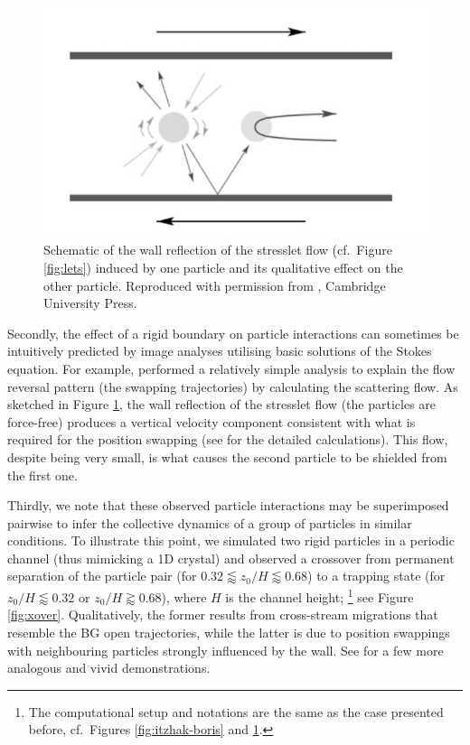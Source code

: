 \begin{figure}%
  \centering
  \includegraphics[width=0.55\columnwidth]{stresslet_reflection.png}
  \caption{Schematic of the wall reflection of the stresslet flow (cf.\ Figure \ref{fig:lets}) induced by one particle and its qualitative effect on the other particle. Reproduced with permission from \cite{zurita-gotor_2007}, \textcopyright \enspace Cambridge University Press.}
  \label{fig:stresslet-refl}
\end{figure}

Secondly, the effect of a rigid boundary on particle interactions can sometimes be intuitively predicted by image analyses utilising basic solutions of the Stokes equation.
For example, \cite{zurita-gotor_2007} performed a relatively simple analysis to explain the flow reversal pattern (\ie the swapping trajectories) by calculating the scattering flow.
As sketched in Figure \ref{fig:stresslet-refl}, the wall reflection of the stresslet flow (the particles are force-free) produces a vertical velocity component consistent with what is required for the position swapping (see \cite{zurita-gotor_2007} for the detailed calculations). This flow, despite being very small, is what causes the second particle to be shielded from the first one.

Thirdly, we note that these observed particle interactions may be superimposed pairwise to infer the collective dynamics of a group of particles in similar conditions.
To illustrate this point, we simulated two rigid particles in a periodic channel (thus mimicking a 1D crystal) and
observed a crossover from permanent separation of the particle pair (for $0.32 \lessapprox z_0/H \lessapprox 0.68$)
to a trapping state (for $z_0/H \lessapprox 0.32$ or $z_0/H \gtrapprox 0.68$),
where $H$ is the channel height;%
\footnote{The computational setup and notations are the same as the case presented before, cf.\ Figures \ref{fig:itzhak-boris} and \ref{fig:stresslet-refl}.}
see Figure \ref{fig:xover}.
Qualitatively, the former results from cross-stream migrations that resemble the BG open trajectories,
while the latter is due to position swappings with neighbouring particles strongly influenced by the wall.
See \cite{Beatus2006, Janssen2012, Uspal2013} for a few more analogous and vivid demonstrations.

